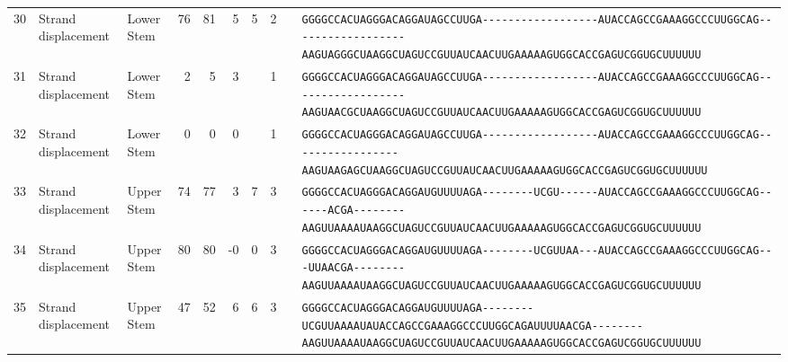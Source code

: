 \begin{tabular}{rllrrrrrcl}
 30 & Strand displacement & Lower Stem & 76 & 81 & 5 & 5 & 2 &  &
 \color{ucsfblack}\verb|GGGGCCACUAGGGACAGGAU|\color{ucsfblue}\verb|AGCCUUGA------------------|\color{ucsfpurple}\verb|AUACCAGCCGAAAGGCCCUUGGCAG|\color{ucsfblue}\verb|------------------AAGUAGGGCU|\color{ucsfnavy}\verb|AAGGCUAGUCCGU|\color{ucsfteal}\verb|UAUCAACUUGAAAAAGUGGCACCGAGUCGGUGC|\color{ucsfblack}\verb|UUUUUU| \\

 31 & Strand displacement & Lower Stem & 2 & 5 & 3 &  & 1 &  &
 \color{ucsfblack}\verb|GGGGCCACUAGGGACAGGAU|\color{ucsfblue}\verb|AGCCUUGA------------------|\color{ucsfpurple}\verb|AUACCAGCCGAAAGGCCCUUGGCAG|\color{ucsfblue}\verb|------------------AAGUAACGCU|\color{ucsfnavy}\verb|AAGGCUAGUCCGU|\color{ucsfteal}\verb|UAUCAACUUGAAAAAGUGGCACCGAGUCGGUGC|\color{ucsfblack}\verb|UUUUUU| \\

 32 & Strand displacement & Lower Stem & 0 & 0 & 0 &  & 1 &  &
 \color{ucsfblack}\verb|GGGGCCACUAGGGACAGGAU|\color{ucsfblue}\verb|AGCCUUGA------------------|\color{ucsfpurple}\verb|AUACCAGCCGAAAGGCCCUUGGCAG|\color{ucsfblue}\verb|-----------------AAGUAAGAGCU|\color{ucsfnavy}\verb|AAGGCUAGUCCGU|\color{ucsfteal}\verb|UAUCAACUUGAAAAAGUGGCACCGAGUCGGUGC|\color{ucsfblack}\verb|UUUUUU| \\

 33 & Strand displacement & Upper Stem & 74 & 77 & 3 & 7 & 3 &  &
 \color{ucsfblack}\verb|GGGGCCACUAGGGACAGGAU|\color{ucsfblue}\verb|GUUUUAGA--------UCGU------|\color{ucsfpurple}\verb|AUACCAGCCGAAAGGCCCUUGGCAG|\color{ucsfblue}\verb|------ACGA--------AAGUUAAAAU|\color{ucsfnavy}\verb|AAGGCUAGUCCGU|\color{ucsfteal}\verb|UAUCAACUUGAAAAAGUGGCACCGAGUCGGUGC|\color{ucsfblack}\verb|UUUUUU| \\

 34 & Strand displacement & Upper Stem & 80 & 80 & -0 & 0 & 3 &  &
 \color{ucsfblack}\verb|GGGGCCACUAGGGACAGGAU|\color{ucsfblue}\verb|GUUUUAGA--------UCGUUAA---|\color{ucsfpurple}\verb|AUACCAGCCGAAAGGCCCUUGGCAG|\color{ucsfblue}\verb|---UUAACGA--------AAGUUAAAAU|\color{ucsfnavy}\verb|AAGGCUAGUCCGU|\color{ucsfteal}\verb|UAUCAACUUGAAAAAGUGGCACCGAGUCGGUGC|\color{ucsfblack}\verb|UUUUUU| \\

 35 & Strand displacement & Upper Stem & 47 & 52 & 6 & 6 & 3 &  &
 \color{ucsfblack}\verb|GGGGCCACUAGGGACAGGAU|\color{ucsfblue}\verb|GUUUUAGA--------UCGUUAAAAU|\color{ucsfpurple}\verb|AUACCAGCCGAAAGGCCCUUGGCAG|\color{ucsfblue}\verb|AUUUUAACGA--------AAGUUAAAAU|\color{ucsfnavy}\verb|AAGGCUAGUCCGU|\color{ucsfteal}\verb|UAUCAACUUGAAAAAGUGGCACCGAGUCGGUGC|\color{ucsfblack}\verb|UUUUUU| \\


\end{tabular}
